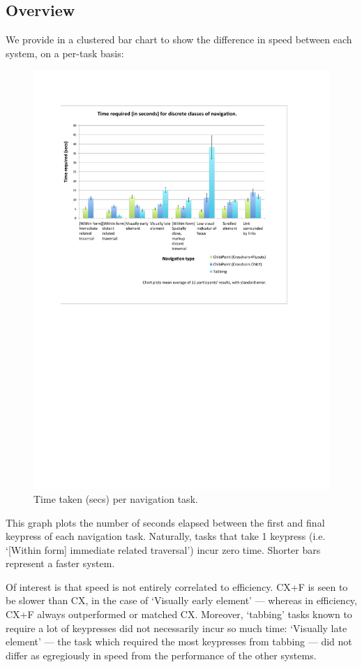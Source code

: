 \documentclass[11pt,openright,a4paper]{report}
\begin{document}
\subsection{Overview}
We provide in  a clustered bar chart to show the difference in speed between each system, on a per-task basis:
\begin{figure}[ht]
\centerline{\includegraphics[width=8in]{figures/TimeGraph2.pdf}}
\caption{Time taken (secs) per navigation task.}
\label{fig:speed}
\end{figure}

This graph plots the number of seconds elapsed between the first and final keypress of each navigation task. Naturally, tasks that take 1 keypress (i.e. `[Within form] immediate related traversal') incur zero time. Shorter bars represent a faster system.

Of interest is that speed is not entirely correlated to efficiency. CX+F is seen to be slower than CX, in the case of `Visually early element' --- whereas in efficiency, CX+F always outperformed or matched CX. Moreover, `tabbing' tasks known to require a lot of keypresses did not necessarily incur so much time: `Visually late element' --- the task which required the most keypresses from tabbing --- did not differ as egregiously in speed from the performance of the other systems.
\end{document}
